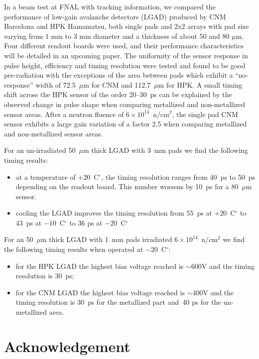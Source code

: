 \documentclass[preprint,1p]{elsarticle}
\begin{document}
In a beam test at FNAL with tracking information, we compared the performance of
low-gain avalanche detectors (LGAD) produced by CNM Barcelona and HPK Hamamatsu,
both single pads and 2x2 arrays with pad size varying from 1 mm to 3 mm diameter
and a thickness of about 50 and 80 $\mu$m. Four different readout boards were
used, and their performance characteristics will be detailed in an upcoming
paper. The uniformity of the sensor response in pulse height, efficiency and
timing resolution were tested and found to be good pre-radiation with the
exceptions of the area between pads which exhibit a ``no-response'' width of
72.5~$\mu$m for CNM and 112.7~$\mu$m for HPK. A small timing shift across the
HPK sensor of the order 20--30~ps can be explained by the observed change in
pulse shape when comparing metallized and non-metallized sensor areas. After a
neutron fluence of $6\times 10^{14}$~n/cm$^2$, the single pad CNM sensor
exhibits a large gain variation of a factor 2.5 when comparing metallized and
non-metallized sensor areas. 

For an un-irradiated 50~$\mu$m thick LGAD with 3~mm pads we find the following timing results: 
\begin{itemize}
  \item at a temperature of $+20$~C$^{\circ}$, the timing resolution ranges from
        40~ps to 50~ps depending on the readout board. This number worsens by
        10~ps for a 80~$\mu$m sensor.
  \item cooling the LGAD improves the timing resolution from 55~ps at
        $+20$~C$^{\circ}$ to 43~ps at $-10$~C$^{\circ}$ to 36 ps at
        $-20$~C$^{\circ}$  
\end{itemize}

For an 50~$\mu$m thick LGAD with 1~mm pads irradiated $6\times 10^{14}$~n/cm$^2$ we find the
following timing results when operated at $-20$~C$^{\circ}$: 
\begin{itemize}
  \item for the HPK LGAD the highest bias voltage reached is $\sim$600V and the timing resolution is 30~ps; 
  \item for the CNM LGAD the highest bias voltage reached is $\sim$400V and the
        timing resolution is 30~ps for the metallized part and~40 ps for the
        un-metallized area.
  
\end{itemize}






\section*{Acknowledgement}
\end{document}
